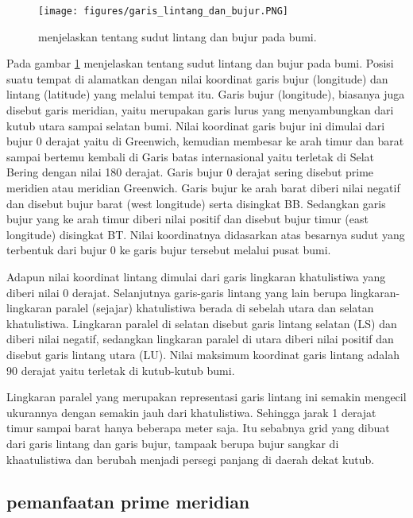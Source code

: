 	
\begin{figure}[ht]
\centerline{\texttt{[image: figures/garis\_lintang\_dan\_bujur.PNG]}}
\caption{menjelaskan tentang sudut lintang dan bujur pada bumi.}
\label{garis_lintang_dan_bujur}
\end{figure}

Pada gambar \ref{garis_lintang_dan_bujur} menjelaskan tentang sudut lintang dan bujur pada bumi. Posisi suatu tempat di alamatkan dengan nilai koordinat garis bujur (longitude) dan lintang (latitude) yang melalui tempat itu. Garis bujur (longitude), 
biasanya juga disebut garis meridian, yaitu merupakan garis lurus yang menyambungkan dari kutub utara sampai selatan bumi. Nilai koordinat garis bujur ini dimulai dari
bujur 0 derajat yaitu di Greenwich, kemudian membesar ke arah timur dan barat sampai bertemu kembali di Garis batas internasional yaitu terletak 
di Selat Bering dengan nilai 180 derajat. Garis bujur 0 derajat sering disebut prime meridien atau meridian Greenwich. Garis bujur ke arah barat diberi 
nilai negatif dan disebut bujur barat (west longitude) serta disingkat BB. Sedangkan garis bujur yang ke arah timur diberi nilai positif 
dan disebut bujur timur (east longitude) disingkat BT. Nilai koordinatnya didasarkan atas besarnya sudut yang terbentuk dari bujur 0 ke garis bujur tersebut
 melalui pusat bumi.

	Adapun nilai koordinat lintang dimulai dari garis lingkaran khatulistiwa yang diberi nilai 0 derajat. Selanjutnya garis-garis lintang yang lain berupa 
lingkaran-lingkaran paralel (sejajar) khatulistiwa berada di sebelah utara dan selatan khatulistiwa. Lingkaran paralel di selatan disebut garis lintang selatan (LS)
dan diberi nilai negatif, sedangkan lingkaran paralel di utara  diberi  nilai positif dan disebut garis lintang utara (LU). Nilai maksimum koordinat 
garis lintang adalah 90 derajat yaitu terletak di kutub-kutub bumi.

	Lingkaran paralel yang merupakan representasi garis lintang ini semakin mengecil ukurannya dengan semakin jauh dari khatulistiwa. Sehingga jarak 1 derajat 
timur sampai barat hanya beberapa meter saja. Itu sebabnya grid yang dibuat dari garis lintang dan garis bujur, tampaak berupa bujur sangkar di khaatulistiwa 
dan berubah menjadi persegi panjang di daerah dekat kutub\cite{zuhdi2012sistem}.

\subsection{pemanfaatan prime meridian}

